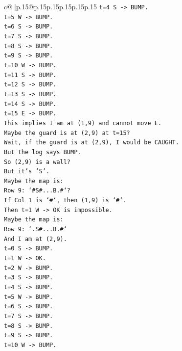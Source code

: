 \documentclass{article}
\begin{document}
{\begin{supertabular}{c@{$\;$}|p{.15\linewidth}@{}p{.15\linewidth}p{.15\linewidth}p{.15\linewidth}p{.15\linewidth}p{.15\linewidth}}
{{{\texttt{t=4 S {-}> BUMP.} \\
\texttt{t=5 W {-}> BUMP.} \\
\texttt{t=6 S {-}> BUMP.} \\
\texttt{t=7 S {-}> BUMP.} \\
\texttt{t=8 S {-}> BUMP.} \\
\texttt{t=9 S {-}> BUMP.} \\
\texttt{t=10 W {-}> BUMP.} \\
\texttt{t=11 S {-}> BUMP.} \\
\texttt{t=12 S {-}> BUMP.} \\
\texttt{t=13 S {-}> BUMP.} \\
\texttt{t=14 S {-}> BUMP.} \\
\texttt{t=15 E {-}> BUMP.} \\
\texttt{This implies I am at (1,9) and cannot move E.} \\
\texttt{Maybe the guard is at (2,9) at t=15?} \\
\texttt{Wait, if the guard is at (2,9), I would be CAUGHT.} \\
\texttt{But the log says BUMP.} \\
\texttt{So (2,9) is a wall?} \\
\texttt{But it's 'S'.} \\
\texttt{Maybe the map is:} \\
\texttt{Row 9: `\#S\#...B.\#`?} \\
\texttt{If Col 1 is `\#`, then (1,9) is `\#`.} \\
\texttt{Then t=1 W {-}> OK is impossible.} \\
\texttt{Maybe the map is:} \\
\texttt{Row 9: `.S\#...B.\#`} \\
\texttt{And I am at (2,9).} \\
\texttt{t=0 S {-}> BUMP.} \\
\texttt{t=1 W {-}> OK.} \\
\texttt{t=2 W {-}> BUMP.} \\
\texttt{t=3 S {-}> BUMP.} \\
\texttt{t=4 S {-}> BUMP.} \\
\texttt{t=5 W {-}> BUMP.} \\
\texttt{t=6 S {-}> BUMP.} \\
\texttt{t=7 S {-}> BUMP.} \\
\texttt{t=8 S {-}> BUMP.} \\
\texttt{t=9 S {-}> BUMP.} \\
\texttt{t=10 W {-}> BUMP.} \\
}}}
\end{supertabular}}
\end{document}
